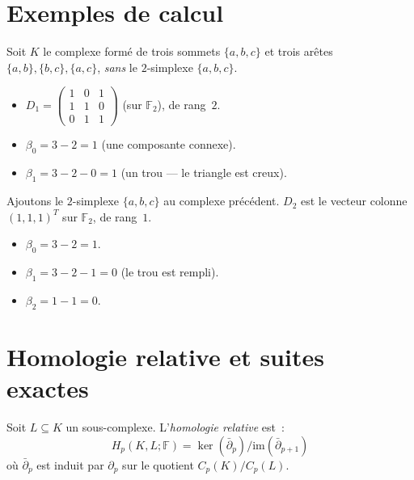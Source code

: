 \section{Exemples de calcul}

\begin{exemple}
Soit $K$ le complexe form\'e de trois sommets $\{a, b, c\}$ et trois
ar\^etes $\{a,b\}, \{b,c\}, \{a,c\}$, \emph{sans} le $2$-simplexe
$\{a,b,c\}$.
\begin{itemize}
  \item $D_1 = \begin{pmatrix} 1 & 0 & 1 \\ 1 & 1 & 0 \\ 0 & 1 & 1 \end{pmatrix}$
        (sur $\mathbb{F}_2$), de rang~$2$.
  \item $\beta_0 = 3 - 2 = 1$ (une composante connexe).
  \item $\beta_1 = 3 - 2 - 0 = 1$ (un trou --- le triangle est creux).
\end{itemize}
\end{exemple}

\begin{exemple}
Ajoutons le $2$-simplexe $\{a,b,c\}$ au complexe pr\'ec\'edent.
$D_2$ est le vecteur colonne $(1, 1, 1)^T$ sur $\mathbb{F}_2$,
de rang~$1$.
\begin{itemize}
  \item $\beta_0 = 3 - 2 = 1$.
  \item $\beta_1 = 3 - 2 - 1 = 0$ (le trou est rempli).
  \item $\beta_2 = 1 - 1 = 0$.
\end{itemize}
\end{exemple}

\section{Homologie relative et suites exactes}

\begin{definition}
Soit $L \subseteq K$ un sous-complexe. L'\emph{homologie relative} est~:
\[
  H_p(K, L; \mathbb{F}) = \ker(\bar{\partial}_p) / \mathrm{im}(\bar{\partial}_{p+1})
\]
o\`u $\bar{\partial}_p$ est induit par $\partial_p$ sur le quotient
$C_p(K)/C_p(L)$.
\end{definition}

